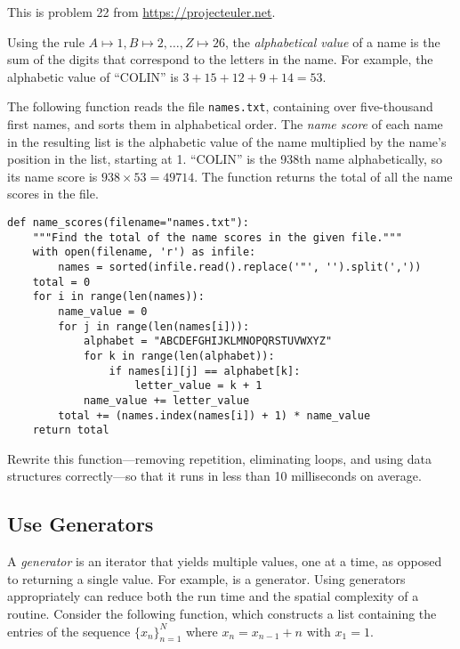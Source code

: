 \begin{problem} %
This is problem 22 from \url{https://projecteuler.net}.

Using the rule $A\mapsto 1, B\mapsto 2, \ldots, Z\mapsto 26$, the \emph{alphabetical value} of a name is the sum of the digits that correspond to the letters in the name.
For example, the alphabetic value of ``COLIN'' is $3 + 15 + 12 + 9 + 14 = 53$.

The following function reads the file \texttt{names.txt}, containing over five-thousand first names, and sorts them in alphabetical order.
The \emph{name score} of each name in the resulting list is the alphabetic value of the name multiplied by the name's position in the list, starting at 1.
``COLIN'' is the 938th name alphabetically, so its name score is $938 \times 53 = 49714$.
The function returns the total of all the name scores in the file.

\begin{lstlisting}
def name_scores(filename="names.txt"):
    """Find the total of the name scores in the given file."""
    with open(filename, 'r') as infile:
        names = sorted(infile.read().replace('"', '').split(','))
    total = 0
    for i in range(len(names)):
        name_value = 0
        for j in range(len(names[i])):
            alphabet = "ABCDEFGHIJKLMNOPQRSTUVWXYZ"
            for k in range(len(alphabet)):
                if names[i][j] == alphabet[k]:
                    letter_value = k + 1
            name_value += letter_value
        total += (names.index(names[i]) + 1) * name_value
    return total
\end{lstlisting}

Rewrite this function---removing repetition, eliminating loops, and using data structures correctly---so that it runs in less than 10 milliseconds on average.
\end{problem}

\subsection*{Use Generators} %

A \emph{generator} is an iterator that yields multiple values, one at a time, as opposed to returning a single value.
For example,  is a generator.
Using generators appropriately can reduce both the run time and the spatial complexity of a routine.
Consider the following function, which constructs a list containing the entries of the sequence $\{x_n\}_{n=1}^N$ where $x_{n} = x_{n-1} + n$ with $x_1 = 1$.

